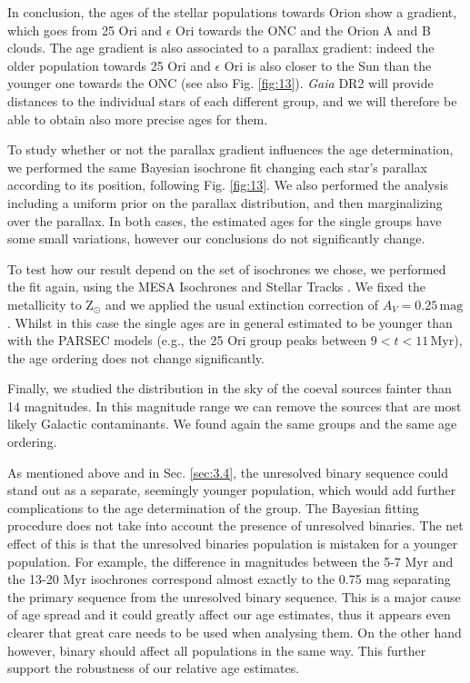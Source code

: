 \documentclass[onecolumn]{aa} %
\begin{document}
In conclusion, the ages of the stellar populations towards Orion show a gradient, which goes from 25 Ori and $\epsilon$ Ori towards the ONC and the Orion A and B clouds.
The age gradient is also associated to a parallax gradient: indeed the older population towards 25 Ori and $\epsilon$ Ori is also closer to the Sun than the younger one towards the ONC (see also Fig. \ref{fig:13}). \textit{Gaia} DR2 will provide distances to the individual stars of each different group, and we will therefore be able to obtain also more precise ages for them. 


To study whether or not the parallax gradient influences the age determination, we performed the same Bayesian isochrone fit changing each star's parallax according to its position, following  Fig. \ref{fig:13}.
We also performed the analysis including a uniform prior on the parallax distribution, and then marginalizing over the parallax. %
In both cases, the estimated ages for the single groups have some small variations, however our conclusions do not significantly change.
 
To test how our  result depend on the set of isochrones we chose, we performed the fit again, using the MESA Isochrones and Stellar Tracks \citep[MIST][]{Mist0, Mist1}. We fixed the metallicity to $\mathrm{Z_{\odot}}$ and we applied the usual extinction correction of $A_V = 0.25 \, \mathrm{mag}$. Whilst in this case the single ages are in general estimated to be younger than with the PARSEC models (e.g., the 25 Ori group peaks between  $9 < t < 11 \, \mathrm{Myr}$), the age ordering does not change significantly.
 
Finally, we studied the distribution in the sky of the coeval sources fainter than 14 magnitudes. In this magnitude range we can remove the sources that are most likely Galactic contaminants. We found again the same groups and the same age ordering.


   
As mentioned above and in Sec. \ref{sec:3.4}, the unresolved binary sequence could stand out as a separate, seemingly younger population, which would add further complications to the age determination of the group. The Bayesian fitting procedure does not take into account the presence of unresolved binaries. The net effect of this is that the unresolved binaries population is mistaken for a younger population. 
For example, the difference in magnitudes between the 5-7 Myr and the 13-20 Myr isochrones correspond almost exactly to the 0.75 mag separating the primary sequence from the unresolved binary sequence. This is a major cause of age spread and it could greatly affect our age estimates, thus it appears even clearer that great care needs to be used when analysing them.
On the other hand however, binary should affect all populations in the same way. This further support the robustness of our relative age estimates. 
 
\end{document}
